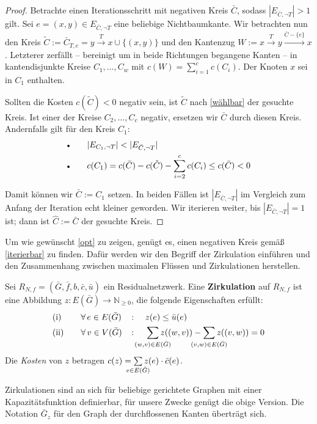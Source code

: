\begin{proof}
Betrachte einen Iterationsschritt mit negativen Kreis $\bar{C}$, sodass $|E_{\bar{C},\neg T}|>1$ gilt. Sei $e=(x,y)\in E_{\bar{C},\neg T}$ eine beliebige Nichtbaumkante. Wir betrachten nun den Kreis $\tilde{C}:=\bar{C}_{T,e}=y\xrightarrow{T}x\cup\{(x,y)\}$ und den Kantenzug $W:=x\xrightarrow{T}y\xrightarrow{\bar{C}-\{e\}}x$. Letzterer zerfällt -- bereinigt um in beide Richtungen begangene Kanten -- in kantendisjunkte Kreise $C_1,\ldots,C_w$ mit $c(W)=\sum_{i=1}^{c} c(C_i)$. Der Knoten $x$ sei \obda in $C_1$ enthalten.

Sollten die Kosten $c(\tilde{C})<0$ negativ sein, ist $\tilde{C}$ nach \cref{wählbar} der gesuchte Kreis. Ist einer der Kreise $C_2,\ldots,C_c$ negativ, ersetzen wir $\bar{C}$ durch diesen Kreis. Andernfalls gilt für den Kreis $C_1$:
\begin{alignat*}{2}
&\scalebox{0.7}{$\bullet$}\quad&&|E_{C_1,\neg T}|<|E_{\bar{C},\neg T}|\\
&\scalebox{0.7}{$\bullet$}\quad&&c(C_1)=c(\bar{C})-c(\tilde{C})-\sum_{i=2}^{c}c(C_i)\leq c(\bar{C})<0
\end{alignat*}

Damit können wir $\bar{C}:=C_1$ setzen. In beiden Fällen ist $|E_{\bar{C},\neg T}|$ im Vergleich zum Anfang der Iteration echt kleiner geworden. Wir iterieren weiter, bis $|E_{\bar{C},\neg T}|=1$ ist; dann ist $\hat{C}:=\bar{C}$ der gesuchte Kreis.\end{proof}

Um wie gewünscht \cref{opt} zu zeigen, genügt es, einen negativen Kreis gemäß \cref{iterierbar} zu finden. Dafür werden wir den Begriff der Zirkulation einführen und den Zusammenhang zwischen maximalen Flüssen und Zirkulationen herstellen.

\begin{defn}\label{zirk}Sei $R_{N,f}= (\bar{G},\bar{f},b,\bar{c},\bar{u})$ ein Residualnetzwerk. Eine \textbf{Zirkulation} auf $R_{N,f}$ ist eine Abbildung $z \colon E(\bar{G})\rightarrow\mathbb{N}_{\geq0}$, die folgende Eigenschaften erfüllt:
\begin{alignat}{3}
&\text{(i)}\quad&&\forall\,e\in E(\bar{G}) &&\colon\quad z(e)\leq \bar{u}(e)\label{zirkI}\\
&\text{(ii)}\quad&&\forall\,v\in V(\bar{G}) &&\colon\quad \sum_{\mathclap{(w,v)\in E(\bar{G})}} z((w,v)) - \sum_{\mathclap{(v,w)\in E(\bar{G})}} z((v,w)) = 0\label{zirkII}
\end{alignat}
Die \emph{Kosten} von $z$ betragen $c(z) = \sum\limits_{\mathclap{e\in E(\bar{G})}} z(e)\cdot \bar{c}(e)$.
\end{defn}
\begin{anm}Zirkulationen sind an sich für beliebige gerichtete Graphen mit einer Kapazitätsfunktion definierbar, für unsere Zwecke genügt die obige Version. Die Notation $\bar{G}_z$ für den Graph der durchflossenen Kanten überträgt sich.\end{anm}

